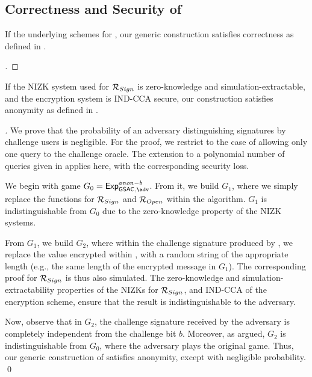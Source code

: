 \subsection{Correctness and Security of \GSACGen}
\label{ssec:security-gsac}

\begin{theorem}
  \label{thm:correctness-gsac}
  If the underlying schemes for , our generic construction \GSACGen
  satisfies correctness as defined in .
\end{theorem}

\begin{proof}[]
\end{proof}

\begin{theorem}
  \label{thm:anonymity-gsac}
  If the NIZK system used for $\mathcal{R}_{Sign}$ is zero-knowledge and
  simulation-extractable, and the encryption system is IND-CCA secure,
  our \GSACGen construction satisfies anonymity as defined in
  .
\end{theorem}

\begin{proof}[]
  We prove that the probability of an adversary distinguishing signatures by
  challenge users is negligible. For the proof, we restrict to the case of
  allowing only one query to the challenge oracle. The extension to a polynomial
  number of queries given in \cite{bsz05} applies here, with the corresponding
  security loss.

  We begin with game $G_0=\ExpGSACAnonb$. From it, we build $G_1$, where we
  simply replace the \NIZKSetup functions for $\mathcal{R}_{Sign}$ and
  $\mathcal{R}_{Open}$ within the \Setup algorithm. $G_1$ is indistinguishable
  from $G_0$ due to the zero-knowledge property of the NIZK systems.

  From $G_1$, we build $G_2$, where within the challenge signature produced by
  \CHALb, we replace the \Ccom value encrypted within \Sign, with a random
  string of the appropriate length (e.g., the same length of the encrypted
  message in $G_1$). The corresponding proof for $\mathcal{R}_{Sign}$ is thus
  also simulated. The zero-knowledge and simulation-extractability properties
  of the NIZKs for $\mathcal{R}_{Sign}$, and IND-CCA of the encryption
  scheme, ensure that the result is indistinguishable to the adversary.

  Now, observe that in $G_2$, the challenge signature received by the adversary
  is completely independent from the challenge bit $b$. Moreover, as argued,
  $G_2$ is indistinguishable from $G_0$, where the adversary plays the original
  \ExpGSACAnonb game. Thus, our generic construction of \GSAC satisfies
  anonymity, except with negligible probability.
  \qed
\end{proof}

